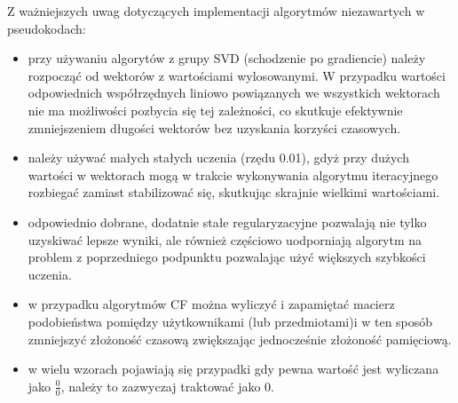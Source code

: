 \documentclass{pracamgr}
\begin{document}
   Z ważniejszych uwag dotyczących implementacji algorytmów niezawartych w pseudokodach:
   \begin{itemize}\itemsep1pt \parskip0pt 
    \item przy używaniu algorytów z grupy SVD (schodzenie po gradiencie) należy rozpocząć od wektorów z wartościami wylosowanymi.
     W przypadku wartości odpowiednich współrzędnych liniowo powiązanych we wszystkich wektorach nie ma możliwości pozbycia się tej zależności,
     co skutkuje efektywnie zmniejszeniem długości wektorów bez uzyskania korzyści czasowych.
    \item należy używać małych stałych uczenia (rzędu 0.01), gdyż przy dużych wartości w wektorach mogą w trakcie wykonywania algorytmu
     iteracyjnego rozbiegać zamiast stabilizować się, skutkując skrajnie wielkimi wartościami.
    \item odpowiednio dobrane, dodatnie stałe regularyzacyjne pozwalają nie tylko uzyskiwać lepsze wyniki, ale również częściowo uodporniają
     algorytm na problem z poprzedniego podpunktu pozwalając użyć większych szybkości uczenia.
    \item w przypadku algorytmów CF można wyliczyć i zapamiętać macierz podobieństwa pomiędzy użytkownikami (lub przedmiotami)i w ten sposób
     zmniejszyć złożoność czasową zwiększając jednocześnie złożoność pamięciową.
    \item w wielu wzorach pojawiają się przypadki gdy pewna wartość jest wyliczana jako $\frac{0}{0}$, należy to zazwyczaj traktować jako $0$.
   \end{itemize}
\end{document}
